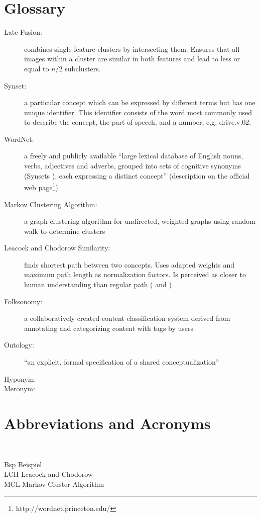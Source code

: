 \section{Glossary} %

\begin{description}
\item[Late Fusion:] combines single-feature clusters by intersecting them. Ensures that all images within a cluster are similar in both features and lead to less or equal to $n/2$ subclusters.

\item[Synset:] a particular concept which can be expressed by different terms but has one unique identifier. This identifier consists of the word most commonly used to describe the concept, the part of speech, and a number, e.g. drive.v.02.

\item[WordNet:] a freely and publicly available ``large lexical database of English nouns, verbs, adjectives and adverbs, grouped into sets of cognitive synonyms (Synsets ), each expressing a distinct concept'' (description on the official web page\footnote{http://wordnet.princeton.edu/})

\item[Markov Clustering Algorithm:] a graph clustering algorithm for undirected, weighted graphs using random walk to determine clusters

\item[Leacock and Chodorow Similarity:] finds shortest path between two concepts. Uses adapted weights and maximum path length as normalization factors. Is perceived as closer to human understanding than regular path (\cite{budanitsky01} and \cite{pedersen2004wordnet})

\item[Folksonomy:] a collaboratively created content classification system derived from annotating and categorizing content with tags by users

\item[Ontology:] ``an explicit, formal specification of a shared conceptualization'' \cite{gruber1993translation}

\item[Hyponym:]

\item[Meronym:]

\end{description}


\newpage

\section{Abbreviations and Acronyms}

\begin{tabbing}
\hspace*{3cm}\=  \\ \kill

Bsp \> Beispiel\\
LCH \> Leacock and Chodorow\\
MCL \> Markov Cluster Algorithm\\

\end{tabbing}

